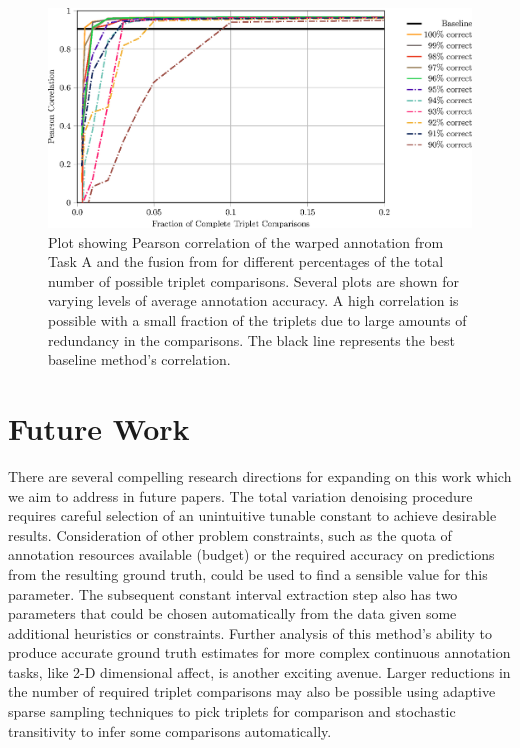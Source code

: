 \documentclass[10pt,letterpaper]{article}
\begin{document}
\begin{figure}[t]
    \begin{adjustwidth}{-2.25in}{0in}
	\centering
    \includegraphics{images/Fig7.eps}
	\caption{Plot showing Pearson correlation of the warped annotation from Task A and the fusion from \cite{Mariooryad2015} for different percentages of the total number of possible triplet comparisons.  Several plots are shown for varying levels of average annotation accuracy.  A high correlation is possible with a small fraction of the triplets due to large amounts of redundancy in the comparisons. The black line represents the best baseline method's correlation.}
	\label{Fig:warp_correlation_robustness}
	\end{adjustwidth}
\end{figure}

\section*{Future Work}
There are several compelling research directions for expanding on this work which we aim to address in future papers.  The total variation denoising procedure requires careful selection of an unintuitive tunable constant to achieve desirable results.  Consideration of other problem constraints, such as the quota of annotation resources available (budget) or the required accuracy on predictions from the resulting ground truth, could be used to find a sensible value for this parameter.  The subsequent constant interval extraction step also has two parameters that could be chosen automatically from the data given some additional heuristics or constraints.  Further analysis of this method's ability to produce accurate ground truth estimates for more complex continuous annotation tasks, like 2-D dimensional affect, is another exciting avenue.  Larger reductions in the number of required triplet comparisons may also be possible using adaptive sparse sampling techniques to pick triplets for comparison and stochastic transitivity to infer some comparisons automatically.
\end{document}

